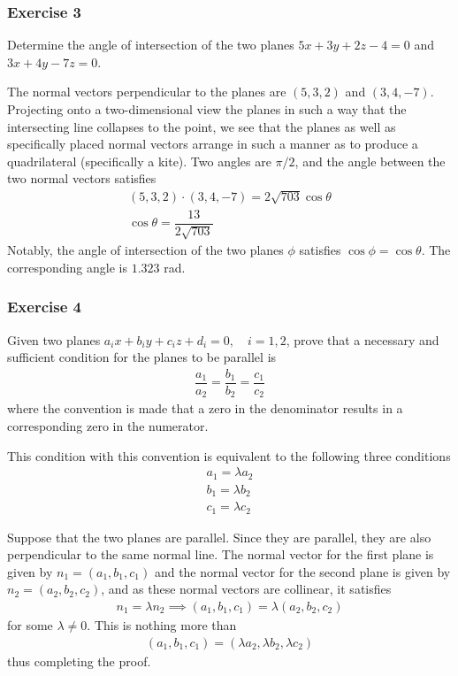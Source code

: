 \documentclass{article}
\begin{document}
	\subsubsection*{Exercise 3}
	Determine the angle of intersection of the two planes $5x + 3y + 2z - 4 = 0$ and $3x + 4y - 7z = 0$.
	
	The normal vectors perpendicular to the planes are $(5, 3, 2)$ and $(3, 4, -7)$. Projecting onto a two-dimensional view the planes in such a way that the intersecting line collapses to the point, we see that the planes as well as specifically placed normal vectors arrange in such a manner as to produce a quadrilateral (specifically a kite). Two angles are $\pi/2$, and the angle between the two normal vectors satisfies
	\begin{gather*}
		(5, 3, 2) \cdot (3, 4, -7) = 2 \sqrt{703} \cos \theta \\
		\cos \theta = \dfrac{13}{2 \sqrt{703}}
	\end{gather*}
	Notably, the angle of intersection of the two planes $\phi$ satisfies $\cos \phi = \cos \theta$. The corresponding angle is $1.323$ rad.
	
	\subsubsection*{Exercise 4}
	Given two planes $a_ix + b_iy + c_iz + d_i = 0, \quad i = 1, 2$, prove that a necessary and sufficient condition for the planes to be parallel is
	\begin{gather*}
		\dfrac{a_1}{a_2} = \dfrac{b_1}{b_2} = \dfrac{c_1}{c_2}
	\end{gather*}
	where the convention is made that a zero in the denominator results in a corresponding zero in the numerator.
	
	This condition with this convention is equivalent to the following three conditions
	\begin{gather*}
		a_1 = \lambda a_2 \\
		b_1 = \lambda b_2 \\
		c_1 = \lambda c_2
	\end{gather*}
	
	Suppose that the two planes are parallel. Since they are parallel, they are also perpendicular to the same normal line. The normal vector for the first plane is given by $n_1 = (a_1, b_1, c_1)$ and the normal vector for the second plane is given by $n_2 = (a_2, b_2, c_2)$, and as these normal vectors are collinear, it satisfies
	\begin{gather*}
		n_1 = \lambda n_2 \implies (a_1, b_1, c_1) = \lambda (a_2, b_2, c_2)
	\end{gather*}
	for some $\lambda \neq 0$. This is nothing more than
	\begin{gather*}
		(a_1, b_1, c_1) = (\lambda a_2, \lambda b_2, \lambda c_2)
	\end{gather*}
	thus completing the proof.
	
\end{document}
